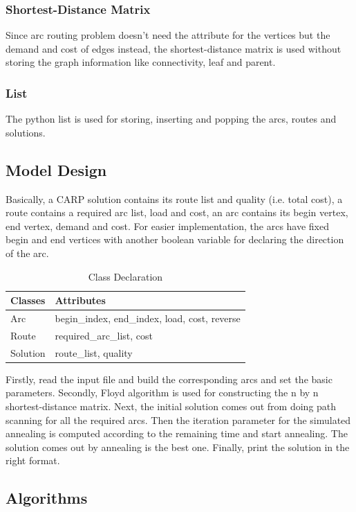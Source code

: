 \documentclass[9pt,shortpaper,twoside,web]{ieeecolor}
\begin{document}
\subsubsection{Shortest-Distance Matrix}
Since arc routing problem doesn't need the attribute for the vertices but the demand and cost of edges instead, the shortest-distance matrix is used without storing the graph information like connectivity, leaf and parent.
\subsubsection{List}
The python list is used for storing, inserting and popping the arcs, routes and solutions. 
\subsection{Model Design}
Basically, a CARP solution contains its route list and quality (i.e. total cost), a route contains a required arc list, load and cost, an arc contains its begin vertex, end vertex, demand and cost. For easier implementation, the arcs have fixed begin and end vertices with another boolean variable for declaring the direction of the arc. 

\begin{table}[ht]
\caption{Class Declaration}
\label{table}
\centering
\begin{tabular}{|l|l|}
\hline
Classes & Attributes \\ \hline
Arc & begin\_index, end\_index, load, cost, reverse \\ \hline
Route & required\_arc\_list, cost \\ \hline
Solution & route\_list, quality \\ \hline
\end{tabular}
\end{table}

Firstly, read the input file and build the corresponding arcs and set the basic parameters. Secondly, Floyd algorithm is used for constructing the n by n shortest-distance matrix. Next, the initial solution comes out from doing path scanning for all the required arcs. Then the iteration parameter for the simulated annealing is computed according to the remaining time and start annealing. The solution comes out by annealing is the best one. Finally, print the solution in the right format.

\subsection{Algorithms}
\end{document}
